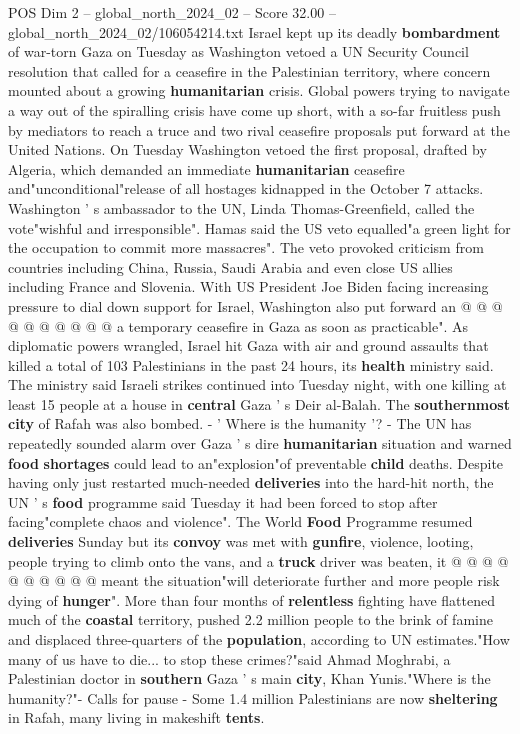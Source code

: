 \begin{textsample}{POS Dim 2 – global\_north\_2024\_02 – Score 32.00 – global\_north\_2024\_02/106054214.txt}  \label{ex:f2_pos_144}
Israel kept up its deadly \textbf{bombardment} of war-torn Gaza on Tuesday as Washington vetoed a UN Security Council resolution that called for a ceasefire in the Palestinian territory, where concern mounted about a growing \textbf{humanitarian} crisis.
Global powers trying to navigate a way out of the spiralling crisis have come up short, with a so-far fruitless push by mediators to reach a truce and two rival ceasefire proposals put forward at the United Nations.
On Tuesday Washington vetoed the first proposal, drafted by Algeria, which demanded an immediate \textbf{humanitarian} ceasefire and"unconditional"release of all hostages kidnapped in the October 7 attacks.
Washington ' s ambassador to the UN, Linda Thomas-Greenfield, called the vote"wishful and irresponsible".
Hamas said the US veto equalled"a green light for the occupation to commit more massacres".
The veto provoked criticism from countries including China, Russia, Saudi Arabia and even close US allies including France and Slovenia.
With US President Joe Biden facing increasing pressure to dial down support for Israel, Washington also put forward an @ @ @ @ @ @ @ @ @ @ a temporary ceasefire in Gaza as soon as practicable".
As diplomatic powers wrangled, Israel hit Gaza with air and ground assaults that killed a total of 103 Palestinians in the past 24 hours, its \textbf{health} ministry said.
The ministry said Israeli strikes continued into Tuesday night, with one killing at least 15 people at a house in \textbf{central} Gaza ' s Deir al-Balah.
The \textbf{southernmost} \textbf{city} of Rafah was also bombed. - ' Where is the humanity '? - The UN has repeatedly sounded alarm over Gaza ' s dire \textbf{humanitarian} situation and warned \textbf{food} \textbf{shortages} could lead to an"explosion"of preventable \textbf{child} deaths.
Despite having only just restarted much-needed \textbf{deliveries} into the hard-hit north, the UN ' s \textbf{food} programme said Tuesday it had been forced to stop after facing"complete chaos and violence".
The World \textbf{Food} Programme resumed \textbf{deliveries} Sunday but its \textbf{convoy} was met with \textbf{gunfire}, violence, looting, people trying to climb onto the vans, and a \textbf{truck} driver was beaten, it @ @ @ @ @ @ @ @ @ @ meant the situation"will deteriorate further and more people risk dying of \textbf{hunger}".
More than four months of \textbf{relentless} fighting have flattened much of the \textbf{coastal} territory, pushed 2.2 million people to the brink of famine and displaced three-quarters of the \textbf{population}, according to UN estimates."How many of us have to die... to stop these crimes?"said Ahmad Moghrabi, a Palestinian doctor in \textbf{southern} Gaza ' s main \textbf{city}, Khan Yunis."Where is the humanity?"- Calls for pause - Some 1.4 million Palestinians are now \textbf{sheltering} in Rafah, many living in makeshift \textbf{tents}.

\end{textsample}
